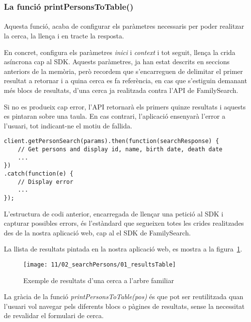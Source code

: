 \subsubsection{La funció printPersonsToTable()}

\paragraph{}
Aquesta funció, acaba de configurar els paràmetres necessaris per poder realitzar la cerca, la llença i en tracte la resposta.

En concret, configura els paràmetres \emph{inici} i \emph{context} i tot seguit, llença la crida asíncrona cap al SDK. Aquests paràmetres, ja han estat descrits en seccions anteriors de la memòria, però recordem que s'encarreguen de delimitar el primer resultat a retornar i a quina cerca es fa referència, en cas que s'estiguin demanant més blocs de resultats, d'una cerca ja realitzada contra l'API de FamilySearch.

Si no es produeix cap error, l'API retornarà els primers quinze resultats i aquests es pintaran sobre una taula. En cas contrari, l'aplicació ensenyarà l'error a l'usuari, tot indicant-ne el motiu de fallida.

\begin{lstlisting}[style=rawOwn,caption={Llençament de peticions contra el SDK i captura d'errors}]
client.getPersonSearch(params).then(function(searchResponse) {
    // Get persons and display id, name, birth date, death date
    ...
})
.catch(function(e) {
    // Display error
    ...
});
\end{lstlisting}

L'estructura de codi anterior, encarregada de llençar una petició al SDK i capturar possibles errors, és l'estàndard que segueixen totes les crides realitzades des de la nostra aplicació web, cap al el SDK de FamilySearch.

La llista de resultats pintada en la nostra aplicació web, es mostra a la figura~\ref{fig:searchTableResults}.

\begin{figure}[h]
    \texttt{[image: 11/02\_searchPersons/01\_resultsTable]}
    \centering
    \caption{Exemple de resultats d'una cerca a l'arbre familiar}\label{fig:searchTableResults}
\end{figure}

La gràcia de la funció \emph{printPersonsToTable(pos)} és que pot ser reutilitzada quan l'usuari vol navegar pels diferents blocs o pàgines de resultats, sense la necessitat de revalidar el formulari de cerca.

